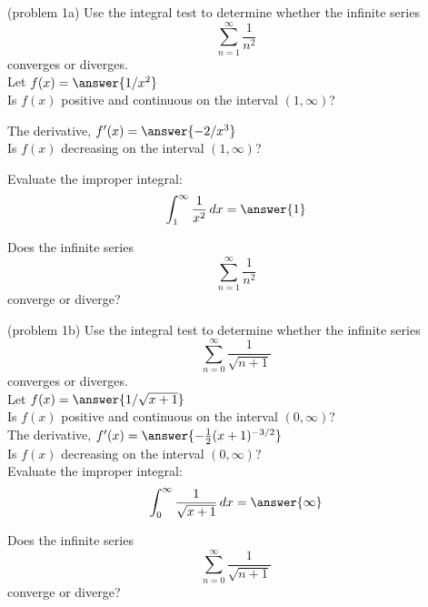 \documentclass[handout]{ximera}
\begin{document}
\begin{problem}(problem 1a)
Use the integral test to determine whether the infinite series
\[
\sum_{n=1}^\infty \frac{1}{n^2}
\]
converges or diverges.\\

Let $f(x) = \answer{ 1/x^2 }$\\

Is $f(x)$ positive and continuous on the interval $(1, \infty)$? 


The derivative, $f'(x) = \answer{-2/x^3}$\\

Is $f(x)$ decreasing on the interval $(1, \infty)$? 


Evaluate the improper integral: 
\[
 \int_1^\infty \frac{1}{x^2} \, dx = \answer{1}
\]

Does the infinite series
\[
\sum_{n=1}^\infty  \frac{1}{n^2}
\]
converge or diverge? 


\end{problem}



\begin{problem}(problem 1b)
Use the integral test to determine whether the infinite series
\[
\sum_{n=0}^\infty \frac{1}{\sqrt{n+1}}
\]
converges or diverges.\\

Let $f(x) = \answer{ 1/\sqrt{x+1} }$\\

Is $f(x)$ positive and continuous on the interval $(0, \infty)$?\\


The derivative, $f'(x) = \answer{-\frac12 (x+1)^{-3/2}}$\\

Is $f(x)$ decreasing on the interval $(0, \infty)$? \\


Evaluate the improper integral: 
\[
 \int_0^\infty \frac{1}{\sqrt{x+1}} \, dx = \answer{\infty}
\]

Does the infinite series
\[
\sum_{n=0}^\infty \frac{1}{\sqrt{n+1}}
\]
converge or diverge?


\end{problem}
\end{document}

